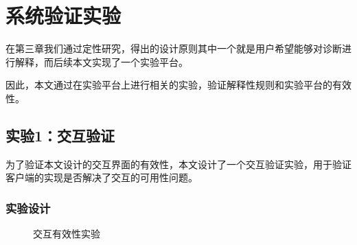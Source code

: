\chapter{系统验证实验}

在第三章我们通过定性研究，得出的设计原则其中一个就是用户希望能够对诊断进行解释，而后续本文实现了一个实验平台。

因此，本文通过在实验平台上进行相关的实验，验证解释性规则和实验平台的有效性。


\section{实验1：交互验证}
为了验证本文设计的交互界面的有效性，本文设计了一个交互验证实验，用于验证客户端的实现是否解决了交互的可用性问题。

\subsection{实验设计}

\begin{figure}[h]
    \centering
    \caption{交互有效性实验}
    \label{fig:interface}
\end{figure}

